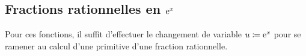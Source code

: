 \documentclass{magnolia}
\begin{document}

\subsection{Fractions rationnelles en ${\rm e}^x$}
Pour ces fonctions, il suffit d'effectuer le changement de variable
$u\coloneqq{\rm e}^x$ pour se ramener au calcul d'une primitive d'une fraction rationnelle.
\end{document}
